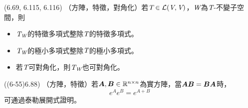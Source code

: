 \item \begin{theorem}{(6.69, 6.115, 6.116)} （方陣，特徵，對角化）若$\textit{T} \in \mathcal{L}(\textit{V}, \textit{V})$，$\textit{W}$為$\textit{T}$-不變子空間，則
	\begin{itemize}
		\item $\textit{T}_{\textit{W}}$的特徵多項式整除$\textit{T}$的特徵多項式。
		\item $\textit{T}_{\textit{W}}$的極小多項式整除$\textit{T}$的極小多項式。
		\item 若$\textit{T}$可對角化，則$\textit{T}_{\textit{W}}$也可對角化。
	\end{itemize}
\end{theorem}

\item \begin{theorem}{((6-55)6.88)} （方陣，特徵）若$\boldsymbol{A}, \boldsymbol{B} \in \mathbb{R}^{n \times n}$為實方陣，當$\boldsymbol{AB} = \boldsymbol{BA}$時，\begin{equation}
		e^{A}e^{B} = e^{A + B}
	\end{equation} 可通過泰勒展開式證明。
\end{theorem}
